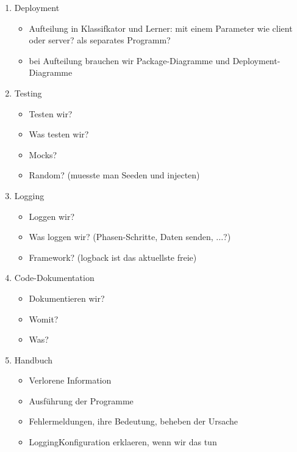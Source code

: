 \documentclass{article}
\begin{document}
\begin{enumerate}
\item Deployment
    \begin{itemize}
        \item Aufteilung in Klassifkator und Lerner: mit einem Parameter wie
              client oder server? als separates Programm?
        \item bei Aufteilung brauchen wir Package-Diagramme und Deployment-
              Diagramme
    \end{itemize}


\item Testing
    \begin{itemize}
        \item Testen wir?
        \item Was testen wir?
        \item Mocks?
        \item Random? (muesste man Seeden und injecten)
    \end{itemize}

\item Logging
    \begin{itemize}
        \item Loggen wir?
        \item Was loggen wir? (Phasen-Schritte, Daten senden, ...?)
        \item Framework? (logback ist das aktuellste freie)
    \end{itemize}

\item Code-Dokumentation
    \begin{itemize}
        \item Dokumentieren wir?
        \item Womit?
        \item Was?
    \end{itemize}

\item Handbuch
    \begin{itemize}
        \item Verlorene Information
        \item Ausf\"uhrung der Programme
        \item Fehlermeldungen, ihre Bedeutung, beheben der Ursache
        \item LoggingKonfiguration erklaeren, wenn wir das tun
    \end{itemize}
\end{enumerate}
\end{document}
